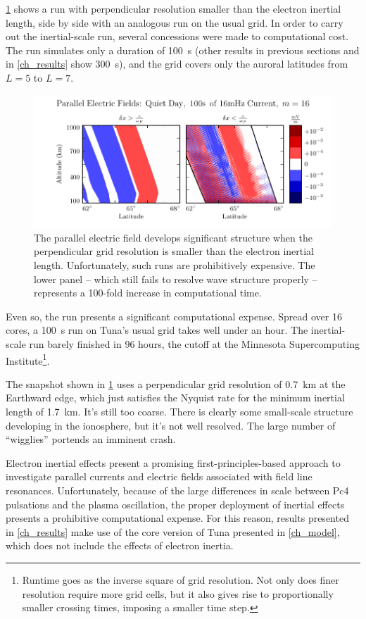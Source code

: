 \cref{fig_inertial_length} shows a run with perpendicular resolution smaller than the electron inertial length, side by side with an analogous run on the usual grid. In order to carry out the inertial-scale run, several concessions were made to computational cost. The run simulates only a duration of \SI{100}{\s} (other results in previous sections and in \cref{ch_results} show \SI{300}{\s}), and the grid covers only the auroral latitudes from $L=5$ to $L=7$. 

\begin{figure}[!htb]
    \centering
    \includegraphics[width=\textwidth]{figures/inertial_length.pdf}
    \caption[Parallel Electric Fields by Perpendicular Grid Resolution]{
      The parallel electric field develops significant structure when the perpendicular grid resolution is smaller than the electron inertial length. Unfortunately, such runs are prohibitively expensive. The lower panel -- which still fails to resolve wave structure properly -- represents a 100-fold increase in computational time. 
    }
    \label{fig_inertial_length}
\end{figure}

Even so, the run presents a significant computational expense. Spread over 16 cores, a \SI{100}{\s} run on Tuna's usual grid takes well under an hour. The inertial-scale run barely finished in 96 hours, the cutoff at the Minnesota Supercomputing Institute\footnote{Runtime goes as the inverse square of grid resolution. Not only does finer resolution require more grid cells, but it also gives rise to proportionally smaller crossing times, imposing a smaller time step. }.

The snapshot shown in \cref{fig_inertial_length} uses a perpendicular grid resolution of \SI{0.7}{\km} at the Earthward edge, which just satisfies the Nyquist rate for the minimum inertial length of \SI{1.7}{\km}. It's still too coarse. There is clearly some small-scale structure developing in the ionosphere, but it's not well resolved. The large number of ``wigglies'' portends an imminent crash. 

Electron inertial effects present a promising first-principles-based approach to investigate parallel currents and electric fields associated with field line resonances. Unfortunately, because of the large differences in scale between Pc4 pulsations and the plasma oscillation, the proper deployment of inertial effects presents a prohibitive computational expense. For this reason, results presented in \cref{ch_results} make use of the core version of Tuna presented in \cref{ch_model}, which does not include the effects of electron inertia. 



